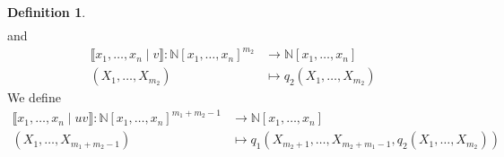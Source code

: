 \documentclass[12pt]{article}
\theoremstyle{plain}
\theoremstyle{definition}
\newtheorem{defn}[thm]{Definition} %
\newcommand{\bb}[1]{\mathbb{#1}}
\newcommand{\lto}{\longrightarrow}
\begin{document}
\begin{defn}
\begin{align*}
			\end{align*}
		and
		\begin{align*}
			\llbracket x_1, \ldots, x_n \mid v \rrbracket: \bb{N}[x_1, \ldots, x_n]^{m_2} &\lto \bb{N}[x_1, \ldots, x_n]\\
			(X_1, \ldots, X_{m_2}) &\longmapsto q_2(X_1, \ldots, X_{m_2})
			\end{align*}
		We define
		\begin{align*}
			\llbracket x_1, \ldots, x_n \mid uv \rrbracket: \bb{N}[x_1, \ldots, x_n]^{m_1 + m_2 -1} &\lto \bb{N}[x_1, \ldots, x_n]\\
			(X_1, \ldots, X_{m_1 + m_2 -1}) &\longmapsto q_1(X_{m_2 + 1}, \ldots, X_{m_2 + m_1 - 1}, q_2(X_{1}, \ldots, X_{m_2}))
			\end{align*}
		\end{defn}
	
\end{document}
